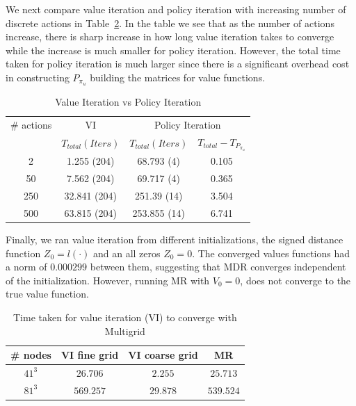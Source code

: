 We next compare value iteration and policy iteration with increasing number of discrete actions in Table~\ref{tab:v_vs_p}. In the table we see that as the number of actions increase, there is sharp increase in how long value iteration takes to converge while the increase is much smaller for policy iteration. However, the total time taken for policy iteration is much larger since there is a significant overhead cost in constructing $P_{\pi_u}$ building the matrices for value functions. 
\begin{table}
\centering
\caption{Value Iteration vs Policy Iteration}
\label{tab:v_vs_p}
\begin{tabular}{|c| c| c| c|}
\hline
\# actions & VI & \multicolumn{2}{|c|}{Policy Iteration} \\ \cline{3-4}
 &  $T_{total} (Iters)$ & $T_{total}(Iters)$ & $T_{total} - T_{P_{\pi_u}}$ \\ \hline
2 & 1.255 (204) & 68.793 (4) & 0.105 \\ \hline
50 &  7.562 (204)&  69.717 (4)& 0.365 \\ \hline
250 & 32.841 (204)&  251.39 (14)& 3.504 \\ \hline
500 & 63.815 (204)&  253.855 (14)& 6.741 \\
\hline
\end{tabular}
\end{table}

Finally, we ran value iteration from different initializations, the signed distance function $Z_0 = l(\cdot)$ and an all zeros $Z_0= 0$. The converged values functions had a norm of $0.000299$ between them, suggesting that MDR converges independent of the initialization. However, running MR with $V_0 = 0$, does not converge to the true value function.

\begin{table}
\centering
\caption{Time taken for value iteration (VI) to converge with Multigrid}
\label{tab:v_vs_p}
\begin{tabular}{|c| c| c| c| }
\hline
\# nodes & VI fine grid & VI coarse grid & MR \\ \hline
$41^3$ & $26.706$ & $2.255$ & $25.713$ \\ \hline
$81^3$ & $569.257$ & $29.878$ & $539.524$ \\ \hline
\end{tabular}
\end{table}